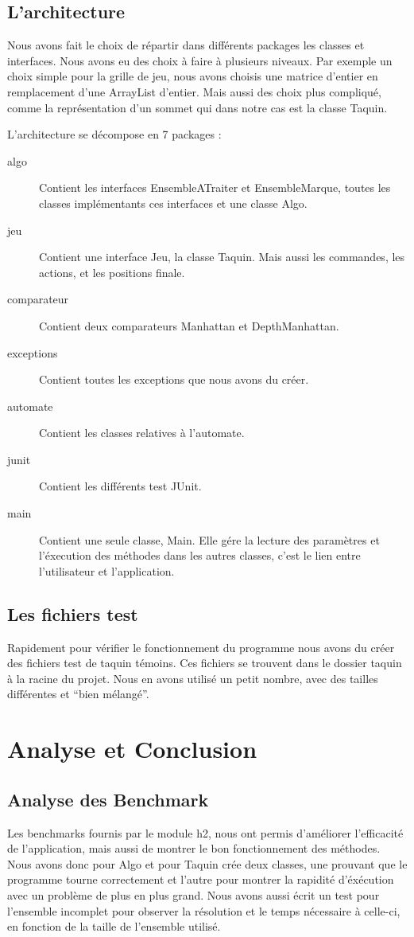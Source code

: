 ﻿\documentclass[a4paper,twoside,12pt]{report}
\begin{document}
\section{L'architecture}
\par
Nous avons fait le choix de répartir dans différents packages les classes et 
interfaces. Nous avons eu des choix à faire à plusieurs niveaux. Par
exemple un choix simple pour la grille de jeu, nous avons choisis une matrice 
d'entier en remplacement d'une ArrayList d'entier. Mais aussi des choix plus
compliqué, comme la représentation d'un sommet qui dans notre cas est la classe 
Taquin.
\par\noindent
L'architecture se décompose en 7 packages : 
\begin{description}
 \item [algo] Contient les interfaces EnsembleATraiter et EnsembleMarque, toutes 
les classes implémentants ces interfaces et une classe Algo.
 \item [jeu] Contient une interface Jeu, la classe Taquin. Mais aussi les 
commandes, les actions, et les positions finale.
 \item [comparateur] Contient deux comparateurs Manhattan et DepthManhattan.
 \item [exceptions] Contient toutes les exceptions que nous avons du créer.
 \item [automate] Contient les classes relatives à l'automate.
 \item [junit] Contient les différents test JUnit.
 \item [main] Contient une seule classe, Main. Elle gére la lecture des 
paramètres et l'éxecution des méthodes dans les autres classes, c'est
 le lien entre l'utilisateur et l'application.
\end{description}

\section{Les fichiers test}
\par
Rapidement pour vérifier le fonctionnement du programme nous avons du créer des fichiers test de taquin témoins. Ces fichiers se trouvent dans le dossier taquin
à la racine du projet. Nous en avons utilisé un petit nombre, avec des tailles différentes et ``bien mélangé''.
%
\chapter{Analyse et Conclusion}
%
\section{Analyse des Benchmark}
%
\par
Les benchmarks fournis par le module h2, nous ont permis d'améliorer l'efficacité de l'application, mais aussi de montrer le bon fonctionnement des méthodes.
Nous avons donc pour Algo et pour Taquin crée deux classes, une prouvant que le programme tourne correctement et l'autre pour montrer la rapidité d'éxécution
avec un problème de plus en plus grand. Nous avons aussi écrit un test pour l'ensemble incomplet pour observer la résolution et le temps nécessaire à celle-ci, en
fonction de la taille de l'ensemble utilisé.
%
\end{document}

